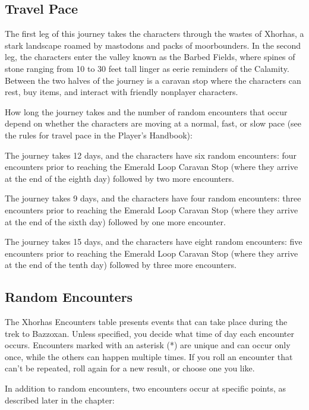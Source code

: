 \documentclass[10pt,a4paper,twoside,bg=print,twocolumn,openany,nodeprecatedcode]{dndbook}
\begin{document}
\subsection{Travel Pace}
The first leg of this journey takes the characters through the wastes of Xhorhas, a stark landscape roamed by mastodons and packs of moorbounders. In the second leg, the characters enter the valley known as the Barbed Fields, where spines of stone ranging from 10 to 30 feet tall linger as eerie reminders of the Calamity. Between the two halves of the journey is a caravan stop where the characters can rest, buy items, and interact with friendly nonplayer characters.

How long the journey takes and the number of random encounters that occur depend on whether the characters are moving at a normal, fast, or slow pace (see the rules for travel pace in the Player's Handbook):


\begin{description}[nolistsep]
\item[Normal Pace.]
The journey takes 12 days, and the characters have six random encounters: four encounters prior to reaching the Emerald Loop Caravan Stop (where they arrive at the end of the eighth day) followed by two more encounters.
\item[Fast Pace.]
The journey takes 9 days, and the characters have four random encounters: three encounters prior to reaching the Emerald Loop Caravan Stop (where they arrive at the end of the sixth day) followed by one more encounter.
\item[Slow Pace.]
The journey takes 15 days, and the characters have eight random encounters: five encounters prior to reaching the Emerald Loop Caravan Stop (where they arrive at the end of the tenth day) followed by three more encounters.
\end{description}

\subsection{Random Encounters}
The Xhorhas Encounters table presents events that can take place during the trek to Bazzoxan. Unless specified, you decide what time of day each encounter occurs. Encounters marked with an asterisk (*) are unique and can occur only once, while the others can happen multiple times. If you roll an encounter that can't be repeated, roll again for a new result, or choose one you like.

In addition to random encounters, two encounters occur at specific points, as described later in the chapter:
\end{document}
